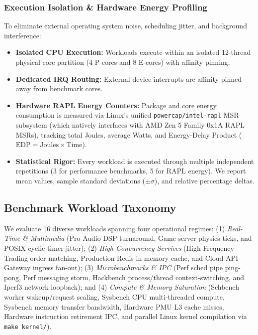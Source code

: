 \documentclass[letterpaper,twocolumn,10pt]{article}
\begin{document}
\subsubsection{Execution Isolation \& Hardware Energy Profiling}
To eliminate external operating system noise, scheduling jitter, and background interference:
\begin{itemize}\setlength{\itemsep}{1pt}\setlength{\parskip}{0pt}
    \item \textbf{Isolated CPU Execution:} Workloads execute within an isolated 12-thread physical core partition (4 P-cores and 8 E-cores) with affinity pinning.
    \item \textbf{Dedicated IRQ Routing:} External device interrupts are affinity-pinned away from benchmark cores.
    \item \textbf{Hardware RAPL Energy Counters:} Package and core energy consumption is measured via Linux's unified \texttt{powercap/intel-rapl} MSR subsystem (which natively interfaces with AMD Zen 5 Family 0x1A RAPL MSRs), tracking total Joules, average Watts, and Energy-Delay Product ($\mathrm{EDP} = \mathrm{Joules} \times \mathrm{Time}$).
    \item \textbf{Statistical Rigor:} Every workload is executed through multiple independent repetitions (3 for performance benchmarks, 5 for RAPL energy). We report mean values, sample standard deviations ($\pm \sigma$), and relative percentage deltas.
\end{itemize}

\subsection{Benchmark Workload Taxonomy}
We evaluate 16 diverse workloads spanning four operational regimes: (1) \emph{Real-Time \& Multimedia} (Pro-Audio DSP turnaround, Game server physics ticks, and POSIX cyclic timer jitter); (2) \emph{High-Concurrency Services} (High-Frequency Trading order matching, Production Redis in-memory cache, and Cloud API Gateway ingress fan-out); (3) \emph{Microbenchmarks \& IPC} (Perf sched pipe ping-pong, Perf messaging storm, Hackbench process/thread context-switching, and Iperf3 network loopback); and (4) \emph{Compute \& Memory Saturation} (Schbench worker wakeup/request scaling, Sysbench CPU multi-threaded compute, Sysbench memory transfer bandwidth, Hardware PMU L3 cache misses, Hardware instruction retirement IPC, and parallel Linux kernel compilation via \texttt{make kernel/}).
\end{document}
